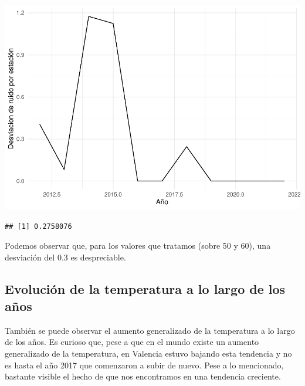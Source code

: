 \documentclass[notspecified,article,submit,moreauthors,pdftex]{Definitions/mdpi}
\newenvironment{Shaded}{\begin{snugshade}}{\end{snugshade}}
\newcommand{\FunctionTok}[1]{\textcolor[rgb]{0.13,0.29,0.53}{\textbf{#1}}}
\newcommand{\NormalTok}[1]{#1}
\newcommand{\SpecialCharTok}[1]{\textcolor[rgb]{0.81,0.36,0.00}{\textbf{#1}}}
\begin{document}
\includegraphics{Memoria_files/figure-latex/unnamed-chunk-30-1.pdf}

\begin{Shaded}
\end{Shaded}

\begin{verbatim}
## [1] 0.2758076
\end{verbatim}

Podemos observar que, para los valores que tratamos (sobre 50 y 60), una
desviación del 0.3 es despreciable.

\hypertarget{evoluciuxf3n-de-la-temperatura-a-lo-largo-de-los-auxf1os}{%
\subsection{Evolución de la temperatura a lo largo de los
años}\label{evoluciuxf3n-de-la-temperatura-a-lo-largo-de-los-auxf1os}}

También se puede observar el aumento generalizado de la temperatura a lo
largo de los años. Es curioso que, pese a que en el mundo existe un
aumento generalizado de la temperatura, en Valencia estuvo bajando esta
tendencia y no es hasta el año 2017 que comenzaron a subir de nuevo.
Pese a lo mencionado, bastante visible el hecho de que nos encontramos
en una tendencia creciente.
\end{document}

